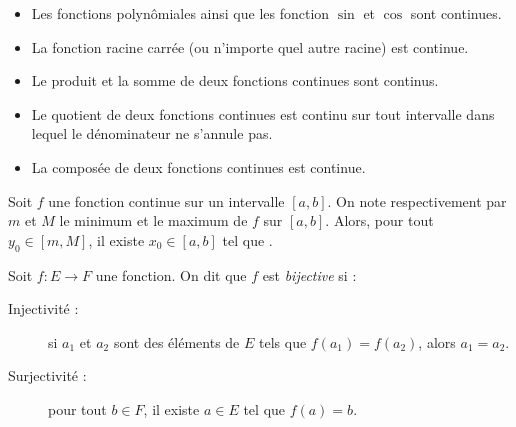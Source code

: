       \begin{prop}\vspace{-1\baselineskip}
      \begin{itemize}
            \item Les fonctions polyn\^omiales ainsi que les fonction $\sin$ et $\cos$ sont continues.
            \item La fonction racine carr\'ee (ou n'importe quel autre racine) est continue.
            \item Le produit et la somme de deux fonctions continues sont continus.
            \item Le quotient de deux fonctions continues est continu sur tout intervalle dans lequel le d\'enominateur ne s'annule pas.
            \item La compos\'ee de deux fonctions continues est continue.
      \end{itemize}
      
      \end{prop}

      \begin{thm}
            Soit $f$ une fonction continue sur un intervalle $[a,b]$.
            On note respectivement par $m$ et $M$ le minimum et le maximum de $f$ sur $[a,b]$.
            Alors, pour tout $y_0\in[m,M]$, il existe $x_0\in[a,b]$ tel que .      
      \end{thm}

      \begin{defi}[Bijective]
            Soit $f : E \rightarrow F$ une fonction.
            On dit que $f$ est \emph{bijective} si : 
                  \begin{description}
                        \item[Injectivit\'e :] 
                                               si $a_1$ et $a_2$ sont des \'el\'ements de $E$ tels que 
                                               $f(a_1) = f(a_2)$, alors $a_1=a_2$.
                        \item[Surjectivit\'e :]
                                               pour tout $b\in F$, il existe $a\in E$ tel que $f(a)=b$.
                  \end{description}
      \end{defi}
      
